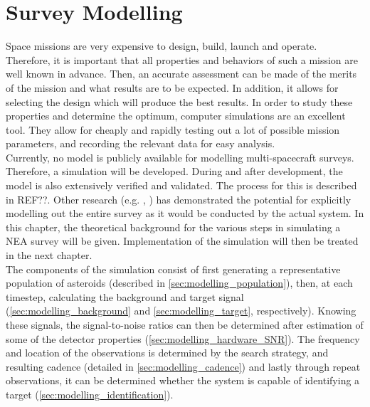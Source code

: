 \chapter{Survey Modelling}

Space missions are very expensive to design, build, launch and operate. Therefore, it is important that all properties and behaviors of such a mission are well known in advance. Then, an accurate assessment can be made of the merits of the mission and what results are to be expected. In addition, it allows for selecting the design which will produce the best results. In order to study these properties and determine the optimum, computer simulations are an excellent tool. They allow for cheaply and rapidly testing out a lot of possible mission parameters, and recording the relevant data for easy analysis. \\

Currently, no model is publicly available for modelling multi-spacecraft surveys. Therefore, a simulation will be developed. During and after development, the model is also extensively verified and validated. The process for this is described in REF??. Other research (e.g. \cite{Flyeye}, \cite{2017NEOSDT}) has demonstrated the potential for explicitly modelling out the entire survey as it would be conducted by the actual system. In this chapter, the theoretical background for the various steps in simulating a NEA survey will be given. Implementation of the simulation will then be treated in the next chapter.\\

The components of the simulation consist of first generating a representative population of asteroids (described in \autoref{sec:modelling_population}), then, at each timestep, calculating the background and target signal (\autoref{sec:modelling_background} and \autoref{sec:modelling_target}, respectively). Knowing these signals, the signal-to-noise ratios can then be determined after estimation of some of the detector properties (\autoref{sec:modelling_hardware_SNR}). The frequency and location of the observations is determined by the search strategy, and resulting cadence (detailed in \autoref{sec:modelling_cadence}) and lastly through repeat observations, it can be determined whether the system is capable of identifying a target (\autoref{sec:modelling_identification}).\\


